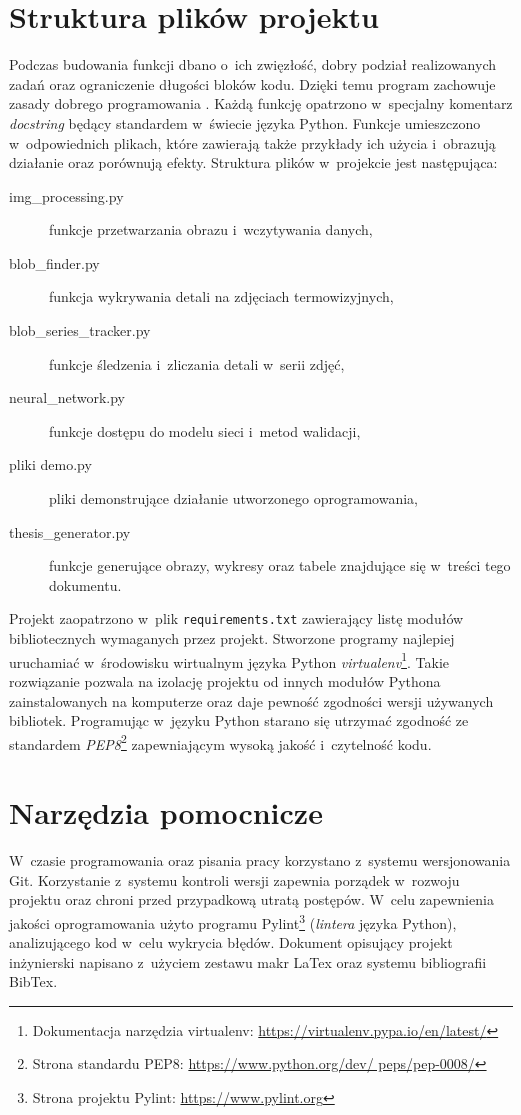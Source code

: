 \section{Struktura plików projektu}
Podczas budowania funkcji dbano o~ich zwięzłość, dobry podział realizowanych
zadań oraz ograniczenie długości bloków kodu.
Dzięki temu program zachowuje zasady dobrego programowania \cite{martin_code}.
Każdą funkcję opatrzono w~specjalny komentarz \emph{docstring} będący
standardem w~świecie języka Python.
Funkcje umieszczono w~odpowiednich plikach, które zawierają także
przykłady ich użycia i~obrazują działanie oraz porównują efekty.
Struktura plików w~projekcie jest następująca:
\begin{description}
    \item[img\_processing.py]
          funkcje przetwarzania obrazu i~wczytywania danych,
    \item[blob\_finder.py]
          funkcja wykrywania detali na zdjęciach termowizyjnych,
    \item[blob\_series\_tracker.py]
          funkcje śledzenia i~zliczania detali w~serii zdjęć,
    \item[neural\_network.py]
          funkcje dostępu do modelu sieci i~metod walidacji,
    \item[pliki demo.py]
          pliki demonstrujące działanie utworzonego oprogramowania,
    \item[thesis\_generator.py]
          funkcje generujące obrazy, wykresy oraz tabele znajdujące się
          w~treści tego dokumentu.
\end{description}

Projekt zaopatrzono w~plik \texttt{requirements.txt} zawierający listę
modułów bibliotecznych wymaganych przez projekt.
Stworzone programy najlepiej uruchamiać w~środowisku wirtualnym języka
Python \emph{virtualenv}\footnote{Dokumentacja narzędzia virtualenv:
\url{https://virtualenv.pypa.io/en/latest/}}.
Takie rozwiązanie pozwala na izolację projektu od innych modułów Pythona
zainstalowanych na komputerze oraz daje pewność zgodności wersji używanych
bibliotek.
Programując w~języku Python starano się utrzymać zgodność ze standardem
\emph{PEP8}\footnote{Strona standardu PEP8: \url{https://www.python.org/dev/
peps/pep-0008/}} zapewniającym wysoką jakość i~czytelność kodu.

\section{Narzędzia pomocnicze}
W~czasie programowania oraz pisania pracy korzystano z~systemu wersjonowania
Git.
Korzystanie z~systemu kontroli wersji zapewnia porządek w~rozwoju projektu
oraz chroni przed przypadkową utratą postępów.
W~celu zapewnienia jakości oprogramowania użyto programu Pylint\footnote{
Strona projektu Pylint: \url{https://www.pylint.org}} (\emph{lintera}
języka Python), analizującego kod w~celu wykrycia błędów.
Dokument opisujący projekt inżynierski napisano z~użyciem zestawu makr
LaTex oraz systemu bibliografii BibTex.

